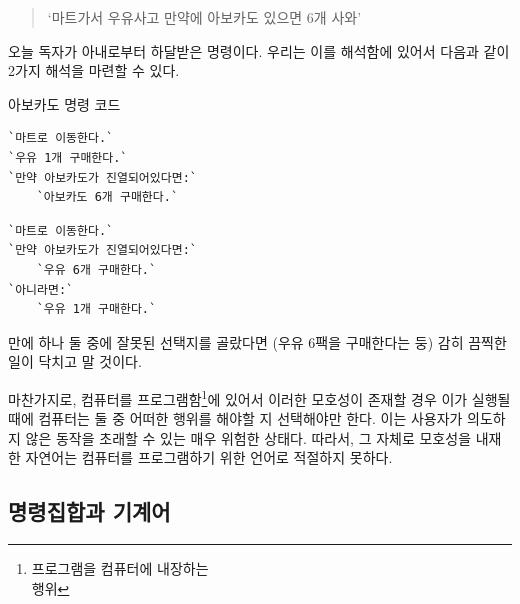 \documentclass[a4paper,12pt]{book}
\begin{document}
\begin{quote}
`마트가서 우유사고 만약에 아보카도 있으면 6개 사와'
\end{quote}

오늘 독자가 아내로부터 하달받은 명령이다.
우리는 이를 해석함에 있어서 다음과 같이 2가지 해석을 마련할 수 있다.

\begin{center}

    \centering

    아보카도 명령 코드

    \begin{minipage}{0.45\textwidth}
        \begin{lstlisting}[escapeinside=``]
`마트로 이동한다.`
`우유 1개 구매한다.`
`만약 아보카도가 진열되어있다면:`
    `아보카도 6개 구매한다.`
        \end{lstlisting}
    \end{minipage}
    \hfill
    \begin{minipage}{0.45\textwidth}
        \begin{lstlisting}[escapeinside=``]
`마트로 이동한다.`
`만약 아보카도가 진열되어있다면:`
    `우유 6개 구매한다.`
`아니라면:`
    `우유 1개 구매한다.`
        \end{lstlisting}
    \end{minipage}

\end{center}

만에 하나 둘 중에 잘못된 선택지를 골랐다면 (우유 6팩을 구매한다는 둥)
감히 끔찍한 일이 닥치고 말 것이다.

마찬가지로, 컴퓨터를 프로그램함\footnote{프로그램을 컴퓨터에 내장하는 \\
행위}에 있어서 이러한 모호성이 존재할 경우 이가 실행될 때에 컴퓨터는 둘
중 어떠한 행위를 해야할 지 선택해야만 한다. 이는 사용자가 의도하지 않은
동작을 초래할 수 있는 매우 위험한 상태다. 따라서, 그 자체로 모호성을
내재한 자연어는 컴퓨터를 프로그램하기 위한 언어로 적절하지 못하다.


\subsection{명령집합과 기계어}
\end{document}
